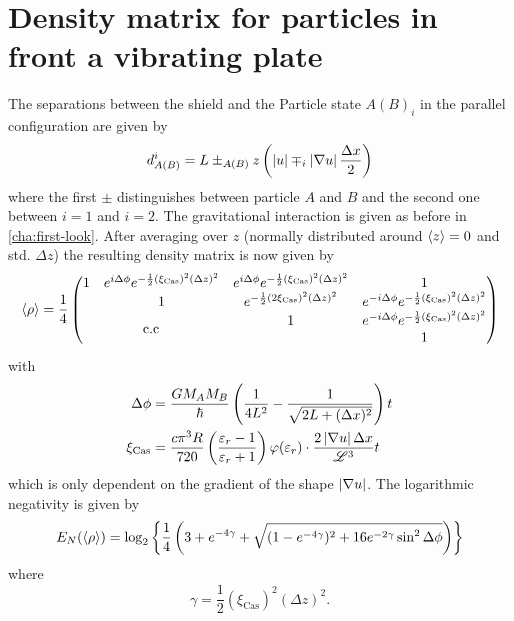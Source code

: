 \section{Density matrix for particles in front a vibrating plate} \label{apx:density-matrix-vibrating-plate}
The separations between the shield and the Particle state $A(B)_i$ in the parallel configuration are given by
\begin{equation}
  d^i_{A(B)} = L \pm_{A(B)} z \left(\left\lvert u\right\rvert \mp_i \left\lvert\nabla u\right\rvert \frac{\Delta x}{2}\right)
\end{equation}
where the first $\pm$ distinguishes between particle $A$ and $B$ and the second one between $i=1$ and $i=2$. The gravitational interaction is given as before in \cref{cha:first-look}.
After averaging over $z$ (normally distributed around $\left\langle z\right\rangle = 0$ and std. $\Delta z$) the resulting density matrix is now given by
\begin{equation}
  \mean{\rho} = \frac{1}{4} \begin{pmatrix}
    1 & e^{i \Delta \phi} e^{- \frac{1}{2} (\xi_\mathrm{Cas})^2 (\Delta z)^2} & e^{i \Delta \phi} e^{- \frac{1}{2} (\xi_\mathrm{Cas})^2 (\Delta z)^2} & 1 \\
    & 1 & e^{- \frac{1}{2} (2 \xi_\mathrm{Cas})^2 (\Delta z)^2} & e^{-i \Delta \phi} e^{- \frac{1}{2} (\xi_\mathrm{Cas})^2(\Delta z)^2} \\
    \multicolumn{2}{c}{\multirow{2}{*}{c.c}} & 1 & e^{-i \Delta \phi} e^{- \frac{1}{2} (\xi_\mathrm{Cas})^2 (\Delta z)^2} \\
    & & & 1
  \end{pmatrix}
\end{equation}
with
\begin{align}
  \Delta \phi &= \frac{G M_A M_B}{\hbar} \left(\frac{1}{4L^2} - \frac{1}{\sqrt{2L + (\Delta x)^2}}\right) t \\
  \xi_\mathrm{Cas} &= \frac{c \pi^3 R}{720} \left(\frac{\varepsilon_r - 1}{\varepsilon_r + 1}\right)\varphi(\varepsilon_r)\cdot \frac{2 \left\lvert\nabla u\right\rvert \Delta x}{\mathscr{L}^3} t
\end{align}
which is only dependent on the gradient of the shape $\left\lvert\nabla u\right\rvert$.
The logarithmic negativity is given by
\begin{equation}\label{eq:apx:en-thermal-shield}
  E_N(\left\langle\rho\right\rangle) = \log_2\left\{\frac{1}{4}\left(3 + e^{-4 \gamma}+\sqrt{(1-e^{-4\gamma})^2 + 16e^{-2\gamma}\sin^2\Delta\phi}\right)\right\}
\end{equation}
where 
\begin{equation}
  \gamma = \frac{1}{2}(\xi_\mathrm{Cas})^2(\Delta z)^2 .
\end{equation}


